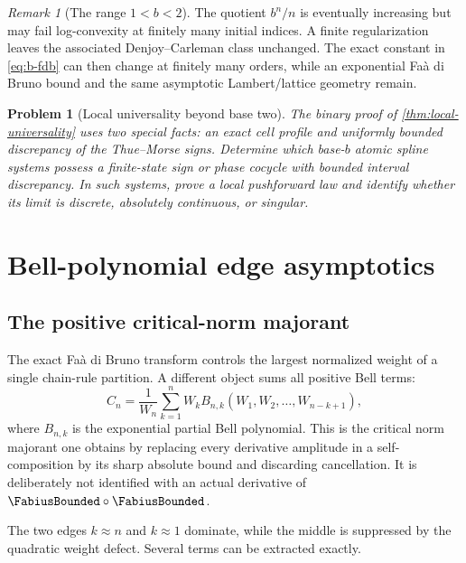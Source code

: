 \documentclass[11pt,a4paper]{article}
\newtheorem{problem}[theorem]{Problem}
\theoremstyle{definition}
\theoremstyle{remark}
\newtheorem{remark}[theorem]{Remark}
\newcommand{\comp}{\mathbin{\circ}}
\begin{document}
\begin{remark}[The range $1<b<2$]
The quotient $b^n/n$ is eventually increasing but may fail log-convexity at finitely
many initial indices.  A finite regularization leaves the associated
Denjoy--Carleman class unchanged.  The exact constant in \eqref{eq:b-fdb} can then
change at finitely many orders, while an exponential Fa\`a di Bruno bound and the
same asymptotic Lambert/lattice geometry remain.
\end{remark}

\begin{problem}[Local universality beyond base two]
The binary proof of \cref{thm:local-universality} uses two special facts: an exact
cell profile and uniformly bounded discrepancy of the Thue--Morse signs.  Determine
which base-$b$ atomic spline systems possess a finite-state sign or phase cocycle
with bounded interval discrepancy.  In such systems, prove a local pushforward law
and identify whether its limit is discrete, absolutely continuous, or singular.
\end{problem}

\section{Bell-polynomial edge asymptotics}
\label{sec:bell}

\subsection{The positive critical-norm majorant}

The exact Fa\`a di Bruno transform controls the largest normalized weight of a
single chain-rule partition.  A different object sums all positive Bell terms:
\begin{equation}
  C_n=\frac1{W_n}
  \sum_{k=1}^{n}W_k
  B_{n,k}(W_1,W_2,\ldots,W_{n-k+1}),
  \label{eq:Cn}
\end{equation}
where $B_{n,k}$ is the exponential partial Bell polynomial.  This is the critical
norm majorant one obtains by replacing every derivative amplitude in a self-composition
by its sharp absolute bound and discarding cancellation.  It is deliberately not
identified with an actual derivative of $\FabiusBounded\comp\FabiusBounded$.

The two edges $k\approx n$ and $k\approx1$ dominate, while the middle is suppressed
by the quadratic weight defect.  Several terms can be extracted exactly.
\end{document}

